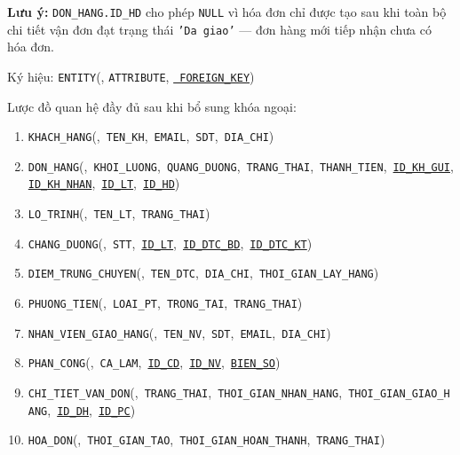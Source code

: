\documentclass[11pt]{report}
\begin{document}
\noindent\textbf{Lưu ý:} \texttt{DON\_HANG.ID\_HD} cho phép \texttt{NULL} vì hóa đơn chỉ được tạo sau khi toàn bộ chi tiết vận đơn đạt trạng thái \texttt{'Da giao'} --- đơn hàng mới tiếp nhận chưa có hóa đơn. 

Ký hiệu: \texttt{ENTITY}(, \texttt{ATTRIBUTE}, \underline{\texttt{\color{RoyalBlue} FOREIGN\_KEY}})

Lược đồ quan hệ đầy đủ sau khi bổ sung khóa ngoại:

\begin{enumerate}
    \item \texttt{KHACH\_HANG}(,\ \texttt{TEN\_KH},\ \texttt{EMAIL},\ \texttt{SDT},\ \texttt{DIA\_CHI})
    \item \texttt{DON\_HANG}(,\ \texttt{KHOI\_LUONG},\ \texttt{QUANG\_DUONG},\ \texttt{TRANG\_THAI},\ \texttt{THANH\_TIEN},\ \underline{\texttt{\color{RoyalBlue}ID\_KH\_GUI}},\\
          \underline{\texttt{\color{RoyalBlue}ID\_KH\_NHAN}},\ \underline{\texttt{\color{RoyalBlue}ID\_LT}},\ \underline{\texttt{\color{RoyalBlue}ID\_HD}})
    \item \texttt{LO\_TRINH}(,\ \texttt{TEN\_LT},\ \texttt{TRANG\_THAI})
    \item \texttt{CHANG\_DUONG}(,\ \texttt{STT},\ \underline{\texttt{\color{RoyalBlue}ID\_LT}},\ \underline{\texttt{\color{RoyalBlue}ID\_DTC\_BD}},\ \underline{\texttt{\color{RoyalBlue}ID\_DTC\_KT}})
    \item \texttt{DIEM\_TRUNG\_CHUYEN}(,\ \texttt{TEN\_DTC},\ \texttt{DIA\_CHI},\ \texttt{THOI\_GIAN\_LAY\_HANG})
    \item \texttt{PHUONG\_TIEN}(,\ \texttt{LOAI\_PT},\ \texttt{TRONG\_TAI},\ \texttt{TRANG\_THAI})
    \item \texttt{NHAN\_VIEN\_GIAO\_HANG}(,\ \texttt{TEN\_NV},\ \texttt{SDT},\ \texttt{EMAIL},\ \texttt{DIA\_CHI})
    \item \texttt{PHAN\_CONG}(,\ \texttt{CA\_LAM},\ \underline{\texttt{\color{RoyalBlue}ID\_CD}},\ \underline{\texttt{\color{RoyalBlue}ID\_NV}},\ \underline{\texttt{\color{RoyalBlue}BIEN\_SO}})
    \item \texttt{CHI\_TIET\_VAN\_DON}(,\ \texttt{TRANG\_THAI},\ \texttt{THOI\_GIAN\_NHAN\_HANG},\ \texttt{THOI\_GIAN\_GIAO\_HANG},\ \underline{\texttt{\color{RoyalBlue}ID\_DH}},\ \underline{\texttt{\color{RoyalBlue}ID\_PC}})
    \item \texttt{HOA\_DON}(,\ \texttt{THOI\_GIAN\_TAO},\ \texttt{THOI\_GIAN\_HOAN\_THANH},\ \texttt{TRANG\_THAI})
\end{enumerate}
\end{document}

